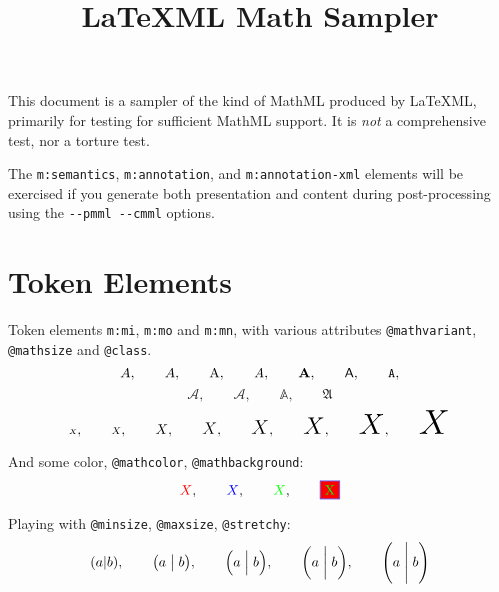 \documentclass{article}
\title{LaTeXML Math Sampler}
\date{}
\makeatletter
\newcommand{\mml}[1]{\texttt{m:#1}}
\newcommand{\attr}[1]{\texttt{@#1}}
\newcommand{\mathsized}[2]{\mbox{#1 $#2$}}
\makeatother
\begin{document}
\maketitle
This document is a sampler of the kind of MathML produced by LaTeXML,
primarily for testing for sufficient MathML support.
It is \emph{not} a comprehensive test, nor a torture test.



The \mml{semantics}, \mml{annotation}, and \mml{annotation-xml} elements
will be exercised if you generate both presentation and content during post-processing
using the \verb|--pmml --cmml| options.


\section{Token Elements}
Token elements \mml{mi}, \mml{mo} and \mml{mn}, with various
attributes \attr{mathvariant}, \attr{mathsize} and \attr{class}.
\begin{equation}
 A,\qquad
 \mathnormal{A},\qquad
 \mathrm{A},\qquad
 \mathit{A},\qquad
 \mathbf{A},\qquad
 \mathsf{A},\qquad
 \mathtt{A},
\end{equation}
\begin{equation}
 \mathcal{A},\qquad
 \mathscr{A},\qquad
 \mathbb{A},\qquad
 \mathfrak{A}
\end{equation}
\begin{equation}
 \mathsized{\tiny}{X},\qquad
 \mathsized{\scriptsize}{X},\qquad
 \mathsized{\normalsize}{X},\qquad
 \mathsized{\large}{X},\qquad
 \mathsized{\Large}{X},\qquad
 \mathsized{\LARGE}{X},\qquad
 \mathsized{\huge}{X},\qquad
 \mathsized{\Huge}{X}
\end{equation}

And some color, \attr{mathcolor}, \attr{mathbackground}:
\begin{equation}
  {\color{red} X}, \qquad
  {\color{blue} X}, \qquad
  {\color{green} X}, \qquad
  \fcolorbox{blue}{red}{\textcolor{green}{X}}
\end{equation}

Playing with \attr{minsize}, \attr{maxsize}, \attr{stretchy}:
\begin{equation}
 (a|b),\qquad
 \bigl(a\bigm|b\bigr),\qquad
 \Bigl(a\Bigm|b\Bigr),\qquad
 \biggl(a\biggm|b\biggr),\qquad
 \Biggl(a\Biggm|b\Biggr)
\end{equation}
\end{document}
